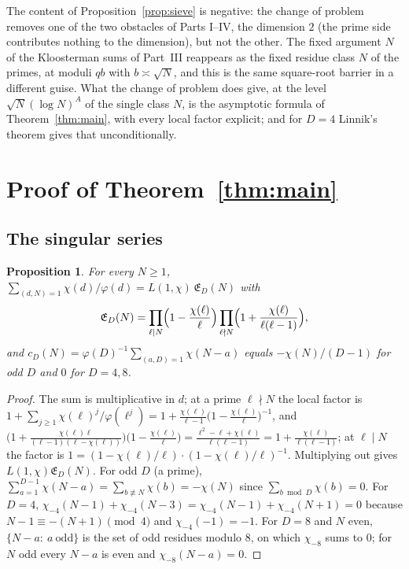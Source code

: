 \documentclass[11pt]{amsart}
\newtheorem{proposition}[theorem]{Proposition}
\theoremstyle{definition}
\theoremstyle{remark}
\newcommand{\sE}{\mathfrak E}
\begin{document}
The content of Proposition~\ref{prop:sieve} is negative: the change of problem removes one of the two obstacles of Parts I--IV, the dimension $2$ (the prime side contributes nothing to the dimension), but not the other. The fixed argument $N$ of the Kloosterman sums of Part~III reappears as the fixed residue class $N$ of the primes, at moduli $qb$ with $b\asymp\sqrt N$, and this is the same square-root barrier in a different guise. What the change of problem does give, at the level $\sqrt N(\log N)^A$ of the single class $N$, is the asymptotic formula of Theorem~\ref{thm:main}, with every local factor explicit; and for $D=4$ Linnik's theorem gives that unconditionally.

\section{Proof of Theorem~\ref{thm:main}}\label{sec:proof}

\subsection{The singular series}
\begin{proposition}\label{prop:series}
For every $N\ge1$, $\sum_{(d,N)=1}\chi(d)/\varphi(d)=L(1,\chi)\,\sE_D(N)$ with
\[
\sE_D(N)=\prod_{\ell\mid N}\Bigl(1-\frac{\chi(\ell)}\ell\Bigr)\prod_{\ell\nmid N}\Bigl(1+\frac{\chi(\ell)}{\ell(\ell-1)}\Bigr),
\]
and $c_D(N)=\varphi(D)^{-1}\sum_{(a,D)=1}\chi(N-a)$ equals $-\chi(N)/(D-1)$ for odd $D$ and $0$ for $D=4,8$.
\end{proposition}
\begin{proof}
The sum is multiplicative in $d$; at a prime $\ell\nmid N$ the local factor is $1+\sum_{j\ge1}\chi(\ell)^j/\varphi(\ell^j)=1+\frac{\chi(\ell)}{\ell-1}\bigl(1-\frac{\chi(\ell)}\ell\bigr)^{-1}$, and $\bigl(1+\frac{\chi(\ell)\ell}{(\ell-1)(\ell-\chi(\ell))}\bigr)\bigl(1-\frac{\chi(\ell)}\ell\bigr)=\frac{\ell^2-\ell+\chi(\ell)}{\ell(\ell-1)}=1+\frac{\chi(\ell)}{\ell(\ell-1)}$; at $\ell\mid N$ the factor is $1=(1-\chi(\ell)/\ell)\cdot(1-\chi(\ell)/\ell)^{-1}$. Multiplying out gives $L(1,\chi)\sE_D(N)$. For odd $D$ (a prime), $\sum_{a=1}^{D-1}\chi(N-a)=\sum_{b\not\equiv N}\chi(b)=-\chi(N)$ since $\sum_{b\bmod D}\chi(b)=0$. For $D=4$, $\chi_{-4}(N-1)+\chi_{-4}(N-3)=\chi_{-4}(N-1)+\chi_{-4}(N+1)=0$ because $N-1\equiv-(N+1)\pmod4$ and $\chi_{-4}(-1)=-1$. For $D=8$ and $N$ even, $\{N-a:\ a\ \text{odd}\}$ is the set of odd residues modulo $8$, on which $\chi_{-8}$ sums to $0$; for $N$ odd every $N-a$ is even and $\chi_{-8}(N-a)=0$.
\end{proof}
\end{document}
